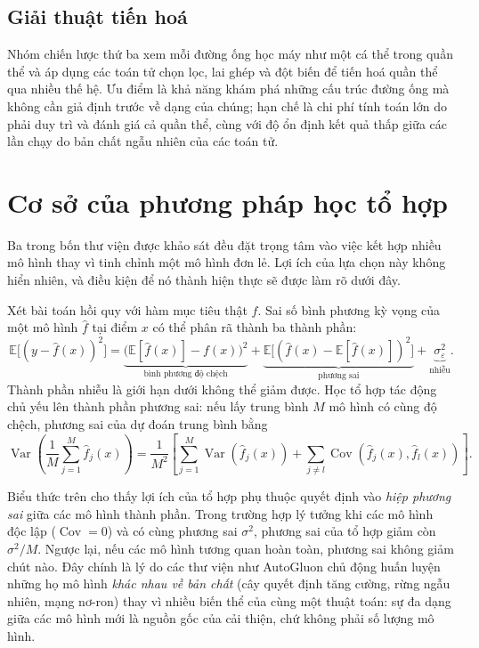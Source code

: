 \subsection{Giải thuật tiến hoá}
Nhóm chiến lược thứ ba xem mỗi đường ống học máy như một cá thể trong quần thể và
áp dụng các toán tử chọn lọc, lai ghép và đột biến để tiến hoá quần thể qua nhiều
thế hệ. Ưu điểm là khả năng khám phá những cấu trúc đường ống mà không cần giả
định trước về dạng của chúng; hạn chế là chi phí tính toán lớn do phải duy trì và
đánh giá cả quần thể, cùng với độ ổn định kết quả thấp giữa các lần chạy do bản
chất ngẫu nhiên của các toán tử.

\section{Cơ sở của phương pháp học tổ hợp}
\label{sec:ensemble}
Ba trong bốn thư viện được khảo sát đều đặt trọng tâm vào việc kết hợp nhiều mô
hình thay vì tinh chỉnh một mô hình đơn lẻ. Lợi ích của lựa chọn này không hiển
nhiên, và điều kiện để nó thành hiện thực sẽ được làm rõ dưới đây.

Xét bài toán hồi quy với hàm mục tiêu thật $f$. Sai số bình phương kỳ vọng của một
mô hình $\hat{f}$ tại điểm $x$ có thể phân rã thành ba thành phần:
\[
    \mathbb{E}\big[(y - \hat{f}(x))^2\big]
    = \underbrace{\big(\mathbb{E}[\hat{f}(x)] - f(x)\big)^2}_{\text{bình phương độ chệch}}
    + \underbrace{\mathbb{E}\big[(\hat{f}(x) - \mathbb{E}[\hat{f}(x)])^2\big]}_{\text{phương sai}}
    + \underbrace{\sigma^2_{\varepsilon}}_{\text{nhiễu}}.
\]
Thành phần nhiễu là giới hạn dưới không thể giảm được. Học tổ hợp tác động chủ yếu
lên thành phần phương sai: nếu lấy trung bình $M$ mô hình có cùng độ chệch, phương
sai của dự đoán trung bình bằng
\[
    \operatorname{Var}\!\left(\frac{1}{M}\sum_{j=1}^{M} \hat{f}_j(x)\right)
    = \frac{1}{M^2}\left[\sum_{j=1}^{M}\operatorname{Var}(\hat{f}_j(x))
    + \sum_{j \neq l}\operatorname{Cov}(\hat{f}_j(x), \hat{f}_l(x))\right].
\]

\begin{nhanxet}
\label{nx:ensemble}
Biểu thức trên cho thấy lợi ích của tổ hợp phụ thuộc quyết định vào \emph{hiệp
phương sai} giữa các mô hình thành phần. Trong trường hợp lý tưởng khi các mô hình
độc lập ($\operatorname{Cov} = 0$) và có cùng phương sai $\sigma^2$, phương sai của
tổ hợp giảm còn $\sigma^2/M$. Ngược lại, nếu các mô hình tương quan hoàn toàn,
phương sai không giảm chút nào. Đây chính là lý do các thư viện như AutoGluon chủ
động huấn luyện những họ mô hình \emph{khác nhau về bản chất} (cây quyết định
tăng cường, rừng ngẫu nhiên, mạng nơ-ron) thay vì nhiều biến thể của cùng một
thuật toán: sự đa dạng giữa các mô hình mới là nguồn gốc của cải thiện, chứ không
phải số lượng mô hình.
\end{nhanxet}

